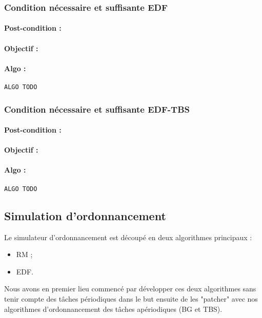 			\subsubsection{Condition nécessaire et suffisante EDF}
				\paragraph{Post-condition :} 
				\paragraph{Objectif :} 
				\paragraph{Algo :} 
					\begin{lstlisting}
ALGO TODO
					\end{lstlisting}
					
			\subsubsection{Condition nécessaire et suffisante EDF-TBS}
				\paragraph{Post-condition :} 
				\paragraph{Objectif :} 
				\paragraph{Algo :} 
					\begin{lstlisting}
ALGO TODO
					\end{lstlisting}
	
		\subsection{Simulation d'ordonnancement}
			Le simulateur d'ordonnancement est découpé en deux algorithmes principaux :
			\begin{itemize}
				\item RM ;
				\item EDF.
			\end{itemize}
			
			Nous avons en premier lieu commencé par développer ces deux algorithmes sans tenir compte des tâches périodiques dans le but ensuite de les "patcher" avec nos algorithmes d'ordonnancement des tâches apériodiques (BG et TBS).
			
